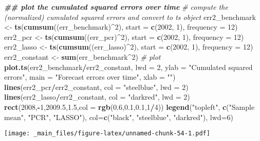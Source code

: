 \documentclass[
]{book}
\newenvironment{Shaded}{\begin{snugshade}}{\end{snugshade}}
\newcommand{\AttributeTok}[1]{\textcolor[rgb]{0.13,0.29,0.53}{#1}}
\newcommand{\CommentTok}[1]{\textcolor[rgb]{0.56,0.35,0.01}{\textit{#1}}}
\newcommand{\DecValTok}[1]{\textcolor[rgb]{0.00,0.00,0.81}{#1}}
\newcommand{\DocumentationTok}[1]{\textcolor[rgb]{0.56,0.35,0.01}{\textbf{\textit{#1}}}}
\newcommand{\FloatTok}[1]{\textcolor[rgb]{0.00,0.00,0.81}{#1}}
\newcommand{\FunctionTok}[1]{\textcolor[rgb]{0.13,0.29,0.53}{\textbf{#1}}}
\newcommand{\NormalTok}[1]{#1}
\newcommand{\OtherTok}[1]{\textcolor[rgb]{0.56,0.35,0.01}{#1}}
\newcommand{\SpecialCharTok}[1]{\textcolor[rgb]{0.81,0.36,0.00}{\textbf{#1}}}
\newcommand{\StringTok}[1]{\textcolor[rgb]{0.31,0.60,0.02}{#1}}
\begin{document}
\begin{Shaded}
\begin{Highlighting}[]
\DocumentationTok{\#\# plot the cumulated squared errors over time}
\CommentTok{\# compute the (normalized) cumulated squared errors and convert to ts object}
\NormalTok{err2\_benchmark }\OtherTok{\textless{}{-}} \FunctionTok{ts}\NormalTok{(}\FunctionTok{cumsum}\NormalTok{((err\_benchmark)}\SpecialCharTok{\^{}}\DecValTok{2}\NormalTok{), }\AttributeTok{start =} \FunctionTok{c}\NormalTok{(}\DecValTok{2002}\NormalTok{, }\DecValTok{1}\NormalTok{), }\AttributeTok{frequency =} \DecValTok{12}\NormalTok{)}
\NormalTok{err2\_pcr       }\OtherTok{\textless{}{-}} \FunctionTok{ts}\NormalTok{(}\FunctionTok{cumsum}\NormalTok{((err\_pcr)}\SpecialCharTok{\^{}}\DecValTok{2}\NormalTok{), }\AttributeTok{start =} \FunctionTok{c}\NormalTok{(}\DecValTok{2002}\NormalTok{, }\DecValTok{1}\NormalTok{), }\AttributeTok{frequency =} \DecValTok{12}\NormalTok{)}
\NormalTok{err2\_lasso     }\OtherTok{\textless{}{-}} \FunctionTok{ts}\NormalTok{(}\FunctionTok{cumsum}\NormalTok{((err\_lasso)}\SpecialCharTok{\^{}}\DecValTok{2}\NormalTok{), }\AttributeTok{start =} \FunctionTok{c}\NormalTok{(}\DecValTok{2002}\NormalTok{, }\DecValTok{1}\NormalTok{), }\AttributeTok{frequency =} \DecValTok{12}\NormalTok{)}
\NormalTok{err2\_constant  }\OtherTok{\textless{}{-}} \FunctionTok{sum}\NormalTok{(err\_benchmark}\SpecialCharTok{\^{}}\DecValTok{2}\NormalTok{)}
\CommentTok{\# plot}
\FunctionTok{plot.ts}\NormalTok{(err2\_benchmark}\SpecialCharTok{/}\NormalTok{err2\_constant, }\AttributeTok{lwd =} \DecValTok{2}\NormalTok{,}
        \AttributeTok{ylab =} \StringTok{"Cumulated squared errors"}\NormalTok{,}
        \AttributeTok{main =} \StringTok{"Forecast errors over time"}\NormalTok{,}
        \AttributeTok{xlab =} \StringTok{""}\NormalTok{)}
\FunctionTok{lines}\NormalTok{(err2\_pcr}\SpecialCharTok{/}\NormalTok{err2\_constant, }\AttributeTok{col =} \StringTok{"steelblue"}\NormalTok{, }\AttributeTok{lwd =} \DecValTok{2}\NormalTok{)}
\FunctionTok{lines}\NormalTok{(err2\_lasso}\SpecialCharTok{/}\NormalTok{err2\_constant, }\AttributeTok{col =} \StringTok{"darkred"}\NormalTok{, }\AttributeTok{lwd =} \DecValTok{2}\NormalTok{)}
\FunctionTok{rect}\NormalTok{(}\DecValTok{2008}\NormalTok{,}\SpecialCharTok{{-}}\DecValTok{1}\NormalTok{,}\FloatTok{2009.5}\NormalTok{,}\FloatTok{1.5}\NormalTok{,}\AttributeTok{col =} \FunctionTok{rgb}\NormalTok{(}\FloatTok{0.6}\NormalTok{,}\FloatTok{0.1}\NormalTok{,}\FloatTok{0.1}\NormalTok{,}\DecValTok{1}\SpecialCharTok{/}\DecValTok{4}\NormalTok{))}
\FunctionTok{legend}\NormalTok{(}\StringTok{"topleft"}\NormalTok{, }\FunctionTok{c}\NormalTok{(}\StringTok{"Sample mean"}\NormalTok{, }\StringTok{"PCR"}\NormalTok{, }\StringTok{"LASSO"}\NormalTok{), }
       \AttributeTok{col=}\FunctionTok{c}\NormalTok{(}\StringTok{"black"}\NormalTok{, }\StringTok{"steelblue"}\NormalTok{, }\StringTok{"darkred"}\NormalTok{), }\AttributeTok{lwd=}\DecValTok{6}\NormalTok{)}
\end{Highlighting}
\end{Shaded}

\texttt{[image: \_main\_files/figure-latex/unnamed-chunk-54-1.pdf]}

  
\end{document}
